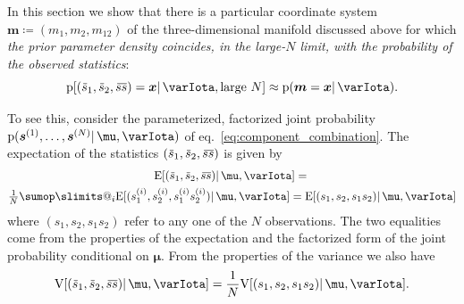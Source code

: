 \documentclass[\ifafour a4paper,12pt,\else a5paper,10pt,\fi%
onecolumn,oneside,article,%
british%
]{memoir}
\makeatletter
\theoremstyle{remark}
\theoremstyle{innote}
\def\sum{\DOTSI\sumop\slimits@}
\newcommand*{\defd}{\coloneqq}
\DeclarePairedDelimiter\clcl{[}{]}
\newcommand*{\pf}{\mathrm{p}}%
\renewcommand*{\|}{\mathpunct{|}}
\newcommand*{\eqn}{eq.}%
\newcommand*{\E}{\mathrm{E}}
\newcommand*{\expeb}{\E\clcl}%
\newcommand*{\widebar}[1]{{\mkern1.5mu\skew{2}\overline{\mkern-1.5mu#1\mkern-1.5mu}\mkern 1.5mu}}
\newcommand*{\yI}{\varIota}
\newcommand*{\ys}{\bm{s}}
\newcommand*{\yso}[1]{\ys^{(#1)}}
\newcommand*{\ysso}[1]{s^{(#1)}}
\newcommand*{\yth}{\bm{\mu}}
\newcommand*{\yt}{\bm{m}}
\newcommand*{\yl}{m_{12}}
\newcommand*{\yavv}{\widebar{s}}
\newcommand*{\ycv}{\widebar{ss}}
\newcommand*{\V}{\mathrm{V}}
\newcommand*{\varb}{\V\clcl}%
\makeatother
\begin{document}
In this section we show that there is a particular coordinate system
$\yt \defd (m_1, m_2, \yl)$ of the three-dimensional manifold discussed above
for which \emph{the prior parameter density coincides, in the large-$N$
  limit, with the probability of the observed statistics}:
\begin{equation}
  \label{eq:special_parameter_is_statistics}
  \pf[(\yavv_1,\yavv_2,\ycv)=\bm{x} \| \yI, \text{large $N$}]
  \approx \pf(\yt=\bm{x} \|\yI).
\end{equation}

To see this, consider the parameterized, factorized joint probability
$\pf(\yso{1}, \dotsc, \yso{N} \|\yth, \yI )$ of
\eqn~\eqref{eq:component_combination}. The expectation of the statistics
$(\yavv_1,\yavv_2,\ycv)$ is given by
\begin{multline}
  \label{eq:expect_statistics}
  \expeb{(\yavv_1,\yavv_2,\ycv) \|\yth,\yI} ={}\\
  \tfrac{1}{N} \sum_{i}
  \expeb{(\ysso{i}_1,\ysso{i}_2,\ysso{i}_1 \ysso{i}_2) \|\yth,\yI}
  = \expeb{(s_1,s_2,s_1 s_2) \|\yth,\yI}
\end{multline}
where $(s_1,s_2,s_1 s_2)$ refer to any one of the $N$ observations. The two
equalities come from the properties of the expectation and the factorized
form of the joint probability conditional on $\yth$. From the properties of
the variance we also have
\begin{equation}
  \label{eq:variance_statistics}
  \varb{(\yavv_1,\yavv_2,\ycv) \|\yth,\yI}
  = \frac{1}{N} \varb{(s_1,s_2,s_1 s_2) \|\yth,\yI}.
\end{equation}
\end{document}
